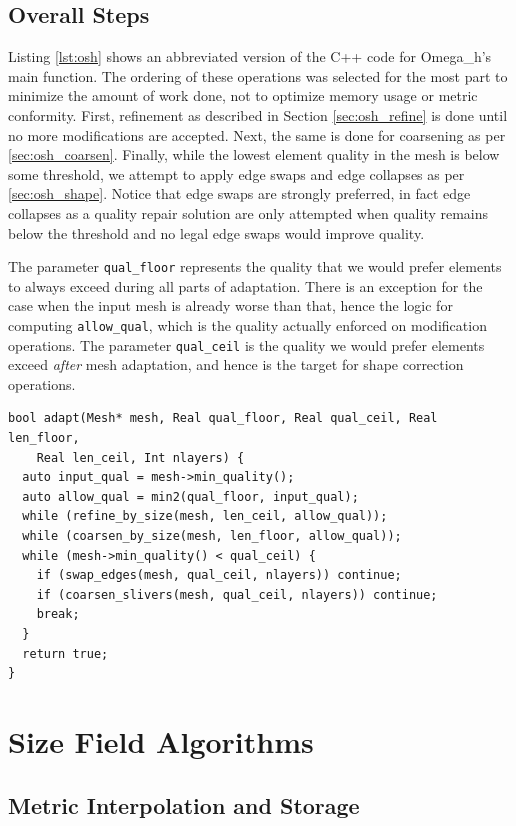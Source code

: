 \subsection{Overall Steps}
\label{sec:osh}

Listing \ref{lst:osh} shows an abbreviated version of the C++ code for
Omega\_h's main function.
The ordering of these operations was selected for the most part to minimize
the amount of work done, not to optimize memory usage or metric conformity.
First, refinement as described in Section \ref{sec:osh_refine} is done
until no more modifications are accepted.
Next, the same is done for coarsening as per \ref{sec:osh_coarsen}.
Finally, while the lowest element quality in the mesh is below some
threshold, we attempt to apply edge swaps and edge collapses as
per \ref{sec:osh_shape}.
Notice that edge swaps are strongly preferred, in fact edge
collapses as a quality repair solution are only attempted when
quality remains below the threshold and no legal edge swaps
would improve quality.

The parameter \texttt{qual\_floor} represents the quality that
we would prefer elements to always exceed during all parts of
adaptation.
There is an exception for the case when the input mesh is
already worse than that, hence the logic for computing
\texttt{allow\_qual}, which is the quality actually enforced
on modification operations.
The parameter \texttt{qual\_ceil} is the quality we would prefer
elements exceed \emph{after} mesh adaptation, and hence is the
target for shape correction operations.

\begin{lstlisting}[float,style=dan-style,caption=Omega\_h main function,label=lst:osh]
bool adapt(Mesh* mesh, Real qual_floor, Real qual_ceil, Real len_floor,
    Real len_ceil, Int nlayers) {
  auto input_qual = mesh->min_quality();
  auto allow_qual = min2(qual_floor, input_qual);
  while (refine_by_size(mesh, len_ceil, allow_qual));
  while (coarsen_by_size(mesh, len_floor, allow_qual));
  while (mesh->min_quality() < qual_ceil) {
    if (swap_edges(mesh, qual_ceil, nlayers)) continue;
    if (coarsen_slivers(mesh, qual_ceil, nlayers)) continue;
    break;
  }
  return true;
}
\end{lstlisting}

\section{Size Field Algorithms}
\label{sec:sf}

\subsection{Metric Interpolation and Storage}
\label{sec:metric_interp}

